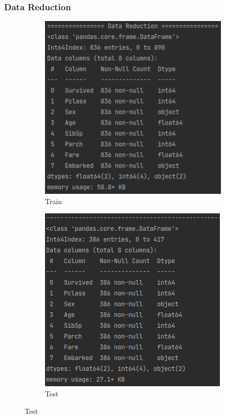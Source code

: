 \documentclass{beamer}
\begin{document}
\begin{frame}
\frametitle{Data Reduction}
\begin{center}
	\begin{figure}
		\begin{subfigure}[p]{0.48\textwidth}
        \includegraphics[width=\linewidth]{./src/figures/5_1.png}
        \caption{Train}
    \end{subfigure} \hfill
		\begin{subfigure}[p]{0.48\textwidth}
        \includegraphics[width=\linewidth]{./src/figures/5_2.png}
        \caption{Test}
    \end{subfigure}
  \end{figure}
\end{center}
\end{frame}
\end{document}
